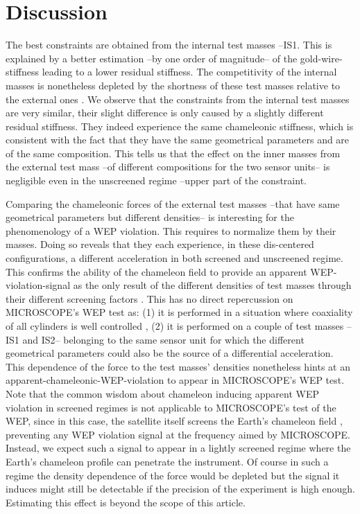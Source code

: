 \documentclass[aps,prd,twocolumn,superscriptaddress,nofootinbib,eqsecnumm,showpacs]{revtex4-1}
\renewcommand\({\left(}
\renewcommand\){\right)}
\renewcommand\[{\left[}
\renewcommand\]{\right]}
\begin{document}
\section{Discussion}
The best constraints are obtained from the internal test masses --IS1. This is explained by a better estimation --by one order of magnitude-- of the gold-wire-stiffness \cite{CQG2} leading to a lower residual stiffness. The competitivity of the internal masses is nonetheless depleted by the shortness of these test masses relative to the external ones \cite{Touboul_2019}. We observe that the constraints from the internal test masses are very similar, their slight difference is only caused by a slightly different residual stiffness. They indeed experience the same chameleonic stiffness, which is consistent with the fact that they have the same geometrical parameters and are of the same composition. This tells us that the effect on the inner masses from the external test mass --of different compositions for the two sensor units-- is negligible even in the unscreened regime --upper part of the constraint.

Comparing the chameleonic forces of the external test masses --that have same geometrical parameters but different densities-- is interesting for the phenomenology of a WEP violation. This requires to normalize them by their masses. Doing so reveals that they each experience, in these dis-centered configurations, a different acceleration in both screened and unscreened regime. This confirms the ability of the chameleon field to provide an apparent WEP-violation-signal as the only result of the different densities of test masses through their different screening factors \cite{khoury_chameleon_2004}. This has no direct repercussion on MICROSCOPE's WEP test as: (1) it is performed in a situation where coaxiality of all cylinders is well controlled \cite{Touboul_2019}, (2) it is performed on a couple of test masses --IS1 and IS2-- belonging to the same sensor unit for which the different geometrical parameters could also be the source of a differential acceleration. This dependence of the force to the test masses' densities nonetheless hints at an apparent-chameleonic-WEP-violation to appear in MICROSCOPE's WEP test. Note that the common wisdom about chameleon inducing apparent WEP violation in screened regimes \citep{khoury_chameleon_2004a,khoury_chameleon_2004} is not applicable to MICROSCOPE's test of the WEP, since in this case, the satellite itself screens the Earth's chameleon field \cite{PRD1}, preventing any WEP violation signal at the frequency aimed by MICROSCOPE. Instead, we expect such a signal to appear in a lightly screened regime where the Earth's chameleon profile can penetrate the instrument. Of course in such a regime the density dependence of the force would be depleted but the signal it induces might still be detectable if the precision of the experiment is high enough. Estimating this effect is beyond the scope of this article.
\end{document}
